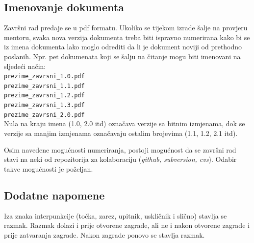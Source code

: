 \subsection{Imenovanje dokumenta}

Završni rad predaje se u pdf formatu. Ukoliko se tijekom izrade šalje na provjeru mentoru, svaka nova verzija dokumenta treba biti 
ispravno numerirana kako bi se iz imena 
dokumenta lako moglo odrediti da li je dokument noviji od prethodno poslanih. Npr. pet dokumenata koji se šalju na čitanje mogu biti 
imenovani na sljedeći način:
\\
\texttt{prezime\_zavrsni\_1.0.pdf}\\
\texttt{prezime\_zavrsni\_1.1.pdf}\\
\texttt{prezime\_zavrsni\_1.2.pdf}\\
\texttt{prezime\_zavrsni\_1.3.pdf}\\
\texttt{prezime\_zavrsni\_2.0.pdf}\\
Nula na kraju imena (1.0, 2.0 itd) označava verzije sa bitnim izmjenama, dok se verzije sa manjim izmjenama označavaju ostalim brojevima (1.1, 1.2, 2.1 itd). 

Osim navedene mogućnosti numeriranja, postoji mogućnost da se završni rad stavi na neki od repozitorija za kolaboraciju (\textit{github, subversion, cvs}). Odabir takve mogućnosti je poželjan.

\subsection{Dodatne napomene}

Iza znaka interpunkcije (točka, zarez, upitnik, uskličnik i slično) stavlja se razmak. Razmak dolazi i prije otvorene zagrade, ali ne i nakon otvorene zagrade i prije zatvaranja zagrade. 
Nakon zagrade ponovo se stavlja razmak.
